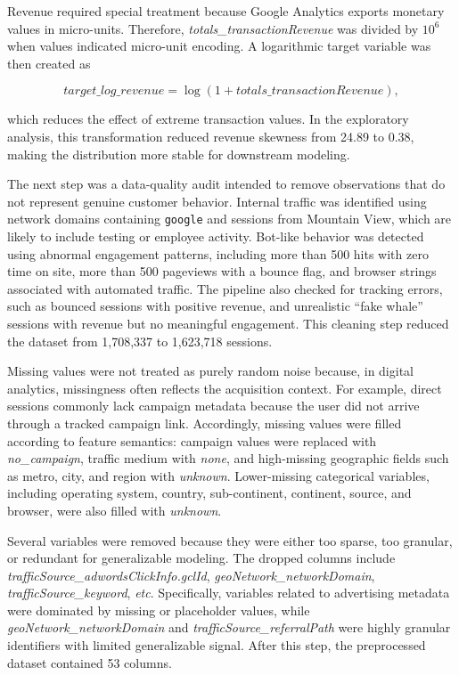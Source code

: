 \documentclass[conference]{IEEEtran}
\begin{document}
Revenue required special treatment because Google Analytics exports monetary values in micro-units. Therefore, \textit{totals\_transactionRevenue} was divided by $10^{6}$ when values indicated micro-unit encoding. A logarithmic target variable was then created as

\begin{equation}
\textit{target\_log\_revenue}=\log(1+\textit{totals\_transactionRevenue}),
\end{equation}

which reduces the effect of extreme transaction values. In the exploratory analysis, this transformation reduced revenue skewness from 24.89 to 0.38, making the distribution more stable for downstream modeling.

The next step was a data-quality audit intended to remove observations that do not represent genuine customer behavior. Internal traffic was identified using network domains containing \texttt{google} and sessions from Mountain View, which are likely to include testing or employee activity. Bot-like behavior was detected using abnormal engagement patterns, including more than 500 hits with zero time on site, more than 500 pageviews with a bounce flag, and browser strings associated with automated traffic. The pipeline also checked for tracking errors, such as bounced sessions with positive revenue, and unrealistic ``fake whale'' sessions with revenue but no meaningful engagement. This cleaning step reduced the dataset from 1,708,337 to 1,623,718 sessions.

Missing values were not treated as purely random noise because, in digital analytics, missingness often reflects the acquisition context. For example, direct sessions commonly lack campaign metadata because the user did not arrive through a tracked campaign link. Accordingly, missing values were filled according to feature semantics: campaign values were replaced with \textit{no\_campaign}, traffic medium with \textit{none}, and high-missing geographic fields such as metro, city, and region with \textit{unknown}. Lower-missing categorical variables, including operating system, country, sub-continent, continent, source, and browser, were also filled with \textit{unknown}.

Several variables were removed because they were either too sparse, too granular, or redundant for generalizable modeling. The dropped columns include \textit{trafficSource\_adwordsClickInfo.gclId}, \textit{geoNetwork\_networkDomain}, \textit{trafficSource\_keyword}, \textit{etc}. Specifically, variables related to advertising metadata were dominated by missing or placeholder values, while \textit{geoNetwork\_networkDomain} and \textit{trafficSource\_referralPath} were highly granular identifiers with limited generalizable signal. After this step, the preprocessed dataset contained 53 columns.
\end{document}
